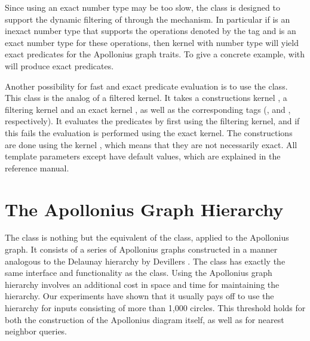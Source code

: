 Since using an exact number type may be too slow, the
 class is designed to
support the dynamic filtering of \cgal{} through the
 mechanism. In particular if 
is an inexact number type that supports the operations denoted by the
tag  and  is an exact number type for these
operations, then kernel with number type
 will yield exact predicates for the
Apollonius graph traits. To give a concrete example,
 with 
 will produce exact predicates.

Another possibility for fast and exact predicate evaluation is to use
the
class. This class is the analog of a filtered kernel. It takes a
constructions kernel , a filtering kernel  and an
exact kernel , as well as the corresponding tags
(,  and , respectively).
It evaluates the predicates by first using the filtering kernel, and
if this fails the evaluation is performed using the exact kernel. The
constructions are done using the kernel , which means that
they are not necessarily exact. All template parameters except
 have default values, which are explained in the reference
manual.



\section{The Apollonius Graph Hierarchy\label{sec:apollonius2-hierarchy}}

The  class is nothing but the equivalent of the 
class, applied to the Apollonius graph. It consists of a series of
Apollonius graphs constructed in a manner analogous to the Delaunay
hierarchy by Devillers \cite{d-iirdt-98}. The class
has exactly the same interface and functionality as the
class. Using the Apollonius graph hierarchy involves an additional
cost in space and time for maintaining the hierarchy. Our experiments
have shown that it usually pays off to use the hierarchy for inputs
consisting of more than 1,000 circles. This threshold holds for both
the construction of the Apollonius diagram itself, as well as for
nearest neighbor queries.


